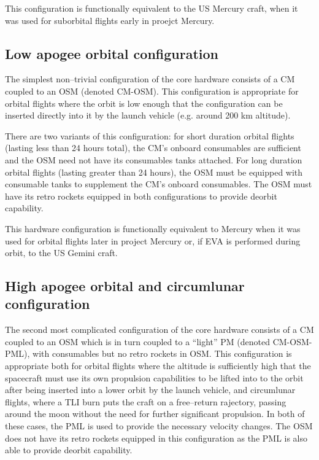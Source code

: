 \documentclass{report}
\begin{document}
This configuration is functionally equivalent to the US Mercury craft, when it was used for suborbital flights early in proejct Mercury.

\subsection{Low apogee orbital configuration}

The simplest non--trivial configuration of the core hardware consists of a CM coupled to an OSM (denoted CM-OSM).  This configuration is appropriate for orbital flights where the orbit is low enough that the configuration can be inserted directly into it by the launch vehicle (e.g. around 200 km altitude).

There are two variants of this configuration: for short duration orbital flights (lasting less than 24 hours total), the CM's onboard consumables are sufficient and the OSM need not have its consumables tanks attached.  For long duration orbital flights (lasting greater than 24 hours), the OSM must be equipped with consumable tanks to supplement the CM's onboard consumables.  The OSM must have its retro rockets equipped in both configurations to provide deorbit capability.

This hardware configuration is functionally equivalent to Mercury when it was used for orbital flights later in project Mercury or, if EVA is performed during orbit, to the US Gemini craft.

\subsection{High apogee orbital and circumlunar configuration}

The second most complicated configuration of the core hardware consists of a CM coupled to an OSM which is in turn coupled to a ``light'' PM (denoted CM-OSM-PML), with consumables but no retro rockets in OSM.  This configuration is appropriate both for orbital flights where the altitude is sufficiently high that the spacecraft must use its own propulsion capabilities to be lifted into to the orbit after being inserted into a lower orbit by the launch vehicle, and circumlunar flights, where a TLI burn puts the craft on a free--return rajectory, passing around the moon without the need for further significant propulsion.  In both of these cases, the PML is used to provide the necessary velocity changes.  The OSM does not have its retro rockets equipped in this configuration as the PML is also able to provide deorbit capability.
\end{document}

